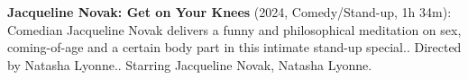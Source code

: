 \textbf{Jacqueline Novak: Get on Your Knees} (2024, Comedy/Stand-up, 1h 34m): Comedian Jacqueline Novak delivers a funny and philosophical meditation on sex, coming-of-age and a certain body part in this intimate stand-up special.. Directed by Natasha Lyonne.. Starring Jacqueline Novak, Natasha Lyonne.